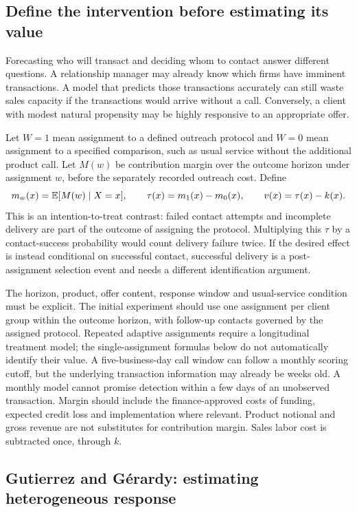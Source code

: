 \subsection{Define the intervention before estimating its value}

Forecasting who will transact and deciding whom to contact answer different questions. A relationship manager may already know which firms have imminent transactions. A model that predicts those transactions accurately can still waste sales capacity if the transactions would arrive without a call. Conversely, a client with modest natural propensity may be highly responsive to an appropriate offer.

Let $W=1$ mean assignment to a defined outreach protocol and $W=0$ mean assignment to a specified comparison, such as usual service without the additional product call. Let $M(w)$ be contribution margin over the outcome horizon under assignment $w$, before the separately recorded outreach cost. Define
\[
 m_w(x)=\mathbb{E}[M(w)\mid X=x],\qquad \tau(x)=m_1(x)-m_0(x),\qquad v(x)=\tau(x)-k(x).
\]
This is an intention-to-treat contrast: failed contact attempts and incomplete delivery are part of the outcome of assigning the protocol. Multiplying this $\tau$ by a contact-success probability would count delivery failure twice. If the desired effect is instead conditional on successful contact, successful delivery is a post-assignment selection event and needs a different identification argument.

The horizon, product, offer content, response window and usual-service condition must be explicit. The initial experiment should use one assignment per client group within the outcome horizon, with follow-up contacts governed by the assigned protocol. Repeated adaptive assignments require a longitudinal treatment model; the single-assignment formulas below do not automatically identify their value. A five-business-day call window can follow a monthly scoring cutoff, but the underlying transaction information may already be weeks old. A monthly model cannot promise detection within a few days of an unobserved transaction. Margin should include the finance-approved costs of funding, expected credit loss and implementation where relevant. Product notional and gross revenue are not substitutes for contribution margin. Sales labor cost is subtracted once, through $k$.

\subsection{Gutierrez and Gérardy: estimating heterogeneous response}

